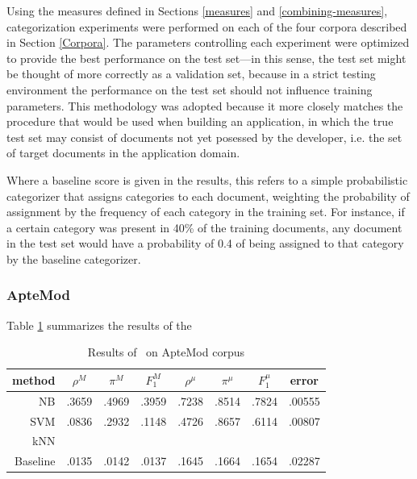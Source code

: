 Using the measures defined in Sections \ref{measures} and
\ref{combining-measures}, categorization experiments were performed on
each of the four corpora described in Section \ref{Corpora}.  The
parameters controlling each experiment were optimized to provide the
best performance on the test set---in this sense, the test set might
be thought of more correctly as a validation set, because in a strict
testing environment the performance on the test set should not
influence training parameters.  This methodology was adopted because
it more closely matches the procedure that would be used when building
an application, in which the true test set may consist of documents
not yet posessed by the developer, i.e. the set of target documents
in the application domain.

Where a baseline score is given in the results, this refers to a
simple probabilistic categorizer that assigns categories to each
document, weighting the probability of assignment by the frequency of
each category in the training set.  For instance, if a certain
category was present in 40\% of the training documents, any document
in the test set would have a probability of 0.4 of being assigned to
that category by the baseline categorizer.  

\subsubsection{ApteMod}

Table \ref{aptemod-results} summarizes the results of the 


\begin{table} \label{aptemod-results}
\begin{center}
\begin{tabular}{|r c c c c c c c|}
\hline
method & $\rho^M$ & $\pi^M$ & $F_1^M$ & $\rho^\mu$ & $\pi^\mu$ & $F_1^\mu$ & error \\
\hline
NB       & .3659 & .4969 & .3959 & .7238 & .8514 & .7824 & .00555 \\
SVM      & .0836 & .2932 & .1148 & .4726 & .8657 & .6114 & .00807 \\
kNN      & \\
Baseline & .0135 & .0142 & .0137 & .1645 & .1664 & .1654 & .02287 \\
\hline
\end{tabular}
\end{center}
\caption{Results of \aicat\ on ApteMod corpus}
\end{table}

